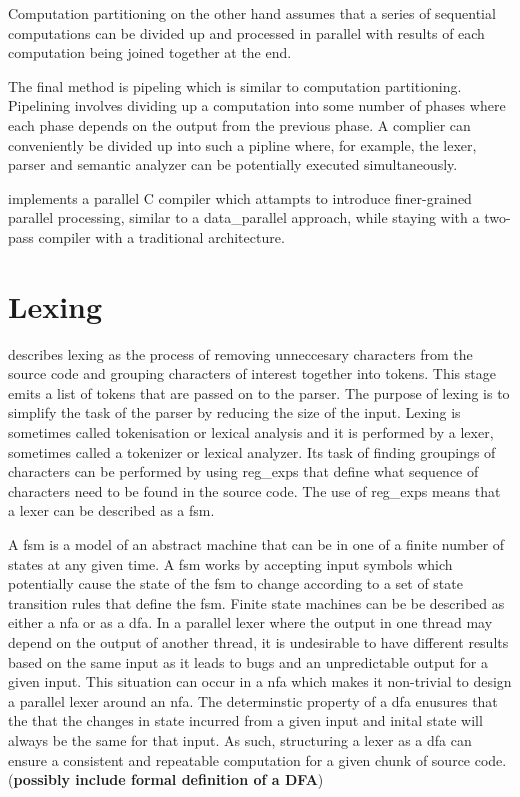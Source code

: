 Computation partitioning on the other hand assumes that a series of sequential
computations can be divided up and processed in parallel with results of
each computation being joined together at the end.

The final method is pipeling which is similar to computation partitioning.
Pipelining involves dividing up a computation into some number of phases
where each phase depends on the output from the previous phase. A complier can
conveniently be divided up into such a pipline where, for example, the lexer,
parser and semantic analyzer can be potentially executed simultaneously. 

\cite{mark_thierry_vandevoorde_parallel_1988} implements a parallel C compiler
which attampts to introduce finer-grained parallel processing, similar to a
\gls{data_parallel} approach, while staying with a two-pass compiler with a
traditional architecture.

\section{Lexing} \label{lit_review_lexing}

\cite{scott_programming_2015} describes lexing as the process of removing
unneccesary characters from the source code and grouping characters of interest
together into tokens. This stage emits a list of tokens that are passed on
to the parser. The purpose of lexing is to simplify the task of the parser by
reducing the size of the input. Lexing is sometimes  called tokenisation or
lexical analysis and it is performed by a lexer, sometimes called a tokenizer or
lexical analyzer. Its task of finding groupings of characters can be performed
by using \glspl{reg_exp} that define what sequence of characters need to be
found in the source code. The use of \glspl{reg_exp} means that a lexer can be
described as a \gls{fsm}.

A \gls{fsm} is a model of an abstract machine that can be in one of a finite
number of states at any given time. A \gls{fsm} works by accepting input symbols
which potentially cause the state of the \gls{fsm} to change according to a set
of state transition rules that define the \gls{fsm}. Finite state machines can
be be described as either a \gls{nfa} or as a \gls{dfa}. In a parallel lexer
where the output in one thread may depend on the output of another thread, it
is undesirable to have different results based on the same input as it leads
to bugs and an unpredictable output for a given input. This situation can occur
in a \gls{nfa} which makes it non-trivial to design a parallel lexer around
an \gls{nfa}. The determinstic property of a \gls{dfa} enusures that the that
the changes in state incurred from a given input and inital state will always
be the same for that input. As such, structuring a lexer as a \gls{dfa} can
ensure a consistent and repeatable computation for a given chunk of source code.
(\textbf{possibly include formal definition of a DFA})

